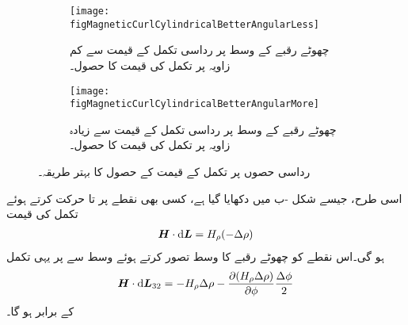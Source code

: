 \begin{figure}
\centering
\begin{subfigure}{0.5\textwidth}
\centering
\texttt{[image: figMagneticCurlCylindricalBetterAngularLess]}
\caption{چھوٹے رقبے کے وسط پر رداسی تکمل کے قیمت سے کم زاویہ پر تکمل کی قیمت کا حصول۔}
\end{subfigure}%
%
\begin{subfigure}{0.5\textwidth}
\centering
\texttt{[image: figMagneticCurlCylindricalBetterAngularMore]}
\caption{چھوٹے رقبے کے وسط پر رداسی تکمل کے قیمت سے زیادہ زاویہ پر تکمل کی قیمت کا حصول۔}
\end{subfigure}%
\caption{رداسی حصوں پر تکمل کے قیمت کے حصول کا بہتر طریقہ۔}
\label{شکل_مقناطیسی_بہتر_گردش_نلکی_رداسی}
\end{figure}
اسی طرح، جیسے شکل -ب میں دکھایا گیا ہے، کسی بھی نقطے پر  تا  حرکت کرتے ہوئے تکمل کی قیمت
\begin{align*}
\kvec{H} \cdot \dif \kvec{L}=H_{\rho}(-\Delta \rho)
\end{align*}
ہو گی۔اس نقطے کو چھوٹے رقبے کا وسط تصور کرتے ہوئے وسط  سے  پر یہی تکمل
\begin{align}\label{مساوات_مقناطیسی_نلکی_دو_تین}
\kvec{H} \cdot \dif \kvec{L}_{32}=-H_{\rho} \Delta \rho-\frac{\partial (H_{\rho} \Delta \rho)}{\partial \phi}\frac{\Delta \phi}{2}
\end{align}
کے برابر ہو گا۔

